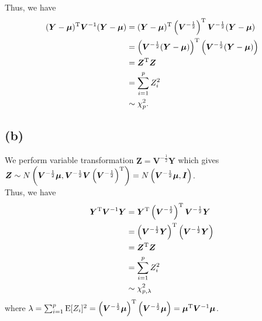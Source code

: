 Thus, we have
\begin{align*}
(\bm{Y} - \bm{\mu})^{\rm T}\bm{V}^{-1}(\bm{Y} - \bm{\mu})
&= (\bm{Y} - \bm{\mu})^{\rm T} \left(\bm{V}^{-\frac{1}{2}}\right)^{\rm T}\bm{V}^{-\frac{1}{2}} (\bm{Y} - \bm{\mu})\\
&= \left(\bm{V}^{-\frac{1}{2}}(\bm{Y} - \bm{\mu})\right)^{\rm T}\left(\bm{V}^{-\frac{1}{2}}(\bm{Y} - \bm{\mu})\right)\\
&= \bm{Z}^{\rm T}\bm{Z}\\
&= \sum_{i=1}^{p} Z_{i}^2\\
&\sim \chi_{p}^2.
\end{align*}

\subsection*{(b)}
We perform variable transformation $\bm{Z} = \bm{V}^{-\frac{1}{2}}\bm{Y}$ which gives $\bm{Z} \sim N\left(\bm{V}^{-\frac{1}{2}}\bm{\mu}, \bm{V}^{-\frac{1}{2}}\bm{V}\left(\bm{V}^{-\frac{1}{2}}\right)^{\rm T} \right) = N\left(\bm{V}^{-\frac{1}{2}}\bm{\mu}, \bm{I}\right)$.\\

Thus, we have
\begin{align*}
\bm{Y}^{\rm T}\bm{V}^{-1}\bm{Y}
&= \bm{Y}^{\rm T} \left(\bm{V}^{-\frac{1}{2}}\right)^{\rm T}\bm{V}^{-\frac{1}{2}}\bm{Y}\\
&= \left(\bm{V}^{-\frac{1}{2}}\bm{Y}\right)^{\rm T}\left(\bm{V}^{-\frac{1}{2}}\bm{Y} \right)\\
&= \bm{Z}^{\rm T}\bm{Z}\\
&= \sum_{i=1}^{p} Z_{i}^2\\
&\sim \chi_{p,\lambda}^2
\end{align*}
where $\lambda = \sum_{i=1}^{p} \mathrm{E}[Z_{i}]^2 = \left(\bm{V}^{-\frac{1}{2}}\bm{\mu}\right)^{\rm T}\left(\bm{V}^{-\frac{1}{2}}\bm{\mu} \right) = \bm{\mu}^{\rm T}\bm{V}^{-1}\bm{\mu}$.